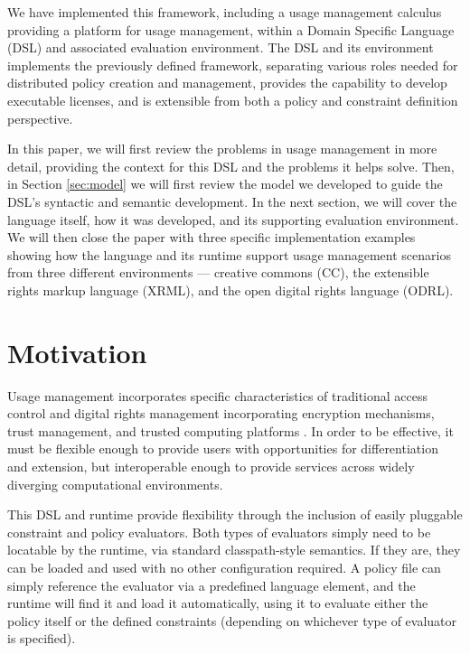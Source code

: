 We have implemented this framework, including a usage management calculus providing a platform for usage management, within a Domain Specific Language (DSL) and associated evaluation environment. The DSL and its environment implements the previously defined framework, separating various roles needed for distributed policy creation and management, provides the capability to develop executable licenses, and is extensible from both a policy and constraint definition perspective.

In this paper, we will first review the problems in usage management in more detail, providing the context for this DSL and the problems it helps solve.  Then, in Section \ref{sec:model} we will first review the model we developed to guide the DSL's syntactic and semantic development. In the next section, we will cover the language itself, how it was developed, and its supporting evaluation environment.  We will then close the paper with three specific implementation examples showing how the language and its runtime support usage management scenarios from three different environments --- creative commons (CC), the extensible rights markup language (XRML), and the open digital rights language (ODRL).

\section{Motivation}\label{sec:motivation}
Usage management incorporates specific characteristics of traditional access control and digital rights management incorporating encryption mechanisms, trust management, and trusted computing platforms \cite{Jamkhedkar:2010:IUM:1866870.1866885}.  In order to be effective, it must be flexible enough to provide users with opportunities for differentiation and extension, but interoperable enough to provide services across widely diverging computational environments.

This DSL and runtime provide flexibility through the inclusion of easily pluggable constraint and policy evaluators.  Both types of evaluators simply need to be locatable by the runtime, via standard classpath-style semantics.  If they are, they can be loaded and used with no other configuration required.  A policy file can simply reference the evaluator via a predefined language element, and the runtime will find it and load it automatically, using it to evaluate either the policy itself or the defined constraints (depending on whichever type of evaluator is specified).

